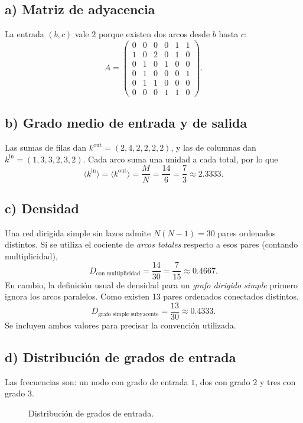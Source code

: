 \documentclass[12pt,a4paper]{article}
\begin{document}
\subsection*{a) Matriz de adyacencia}
La entrada $(b,c)$ vale $2$ porque existen dos arcos desde $b$ hasta $c$:
\[
A=\begin{pmatrix}
0&0&0&0&1&1\\
1&0&2&0&1&0\\
0&1&0&1&0&0\\
0&1&0&0&0&1\\
0&1&1&0&0&0\\
0&0&0&1&1&0
\end{pmatrix}.
\]
\subsection*{b) Grado medio de entrada y de salida}
Las sumas de filas dan $k^{\mathrm{out}}=(2,4,2,2,2,2)$, y las de columnas dan $k^{\mathrm{in}}=(1,3,3,2,3,2)$. Cada arco suma una unidad a cada total, por lo que
\[
\boxed{\langle k^{\mathrm{in}}\rangle=\langle k^{\mathrm{out}}\rangle=\frac{M}{N}=\frac{14}{6}=\frac73\approx2.3333.}
\]
\subsection*{c) Densidad}
Una red dirigida simple sin lazos admite $N(N-1)=30$ pares ordenados distintos. Si se utiliza el cociente de \emph{arcos totales} respecto a esos pares (contando multiplicidad),
\[
\boxed{D_{\text{con multiplicidad}}=\frac{14}{30}=\frac7{15}\approx0.4667.}
\]
En cambio, la definición usual de densidad para un \emph{grafo dirigido simple} primero ignora los arcos paralelos. Como existen 13 pares ordenados conectados distintos,
\[
\boxed{D_{\text{grafo simple subyacente}}=\frac{13}{30}\approx0.4333.}
\]
Se incluyen ambos valores para precisar la convención utilizada.
\subsection*{d) Distribución de grados de entrada}
Las frecuencias son: un nodo con grado de entrada $1$, dos con grado $2$ y tres con grado $3$.
\begin{figure}[H]\centering
{}
\caption{Distribución de grados de entrada.}
\end{figure}
\end{document}
